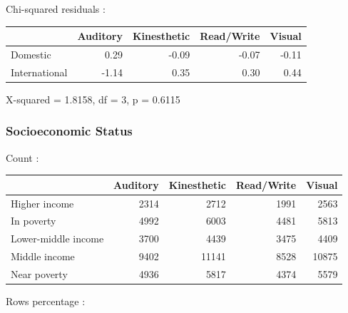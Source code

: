 \documentclass[
  twocolumn]{article}
\newenvironment{Shaded}{\begin{snugshade}}{\end{snugshade}}
\newcommand{\FunctionTok}[1]{\textcolor[rgb]{0.13,0.29,0.53}{\textbf{#1}}}
\newcommand{\NormalTok}[1]{#1}
\newcommand{\SpecialCharTok}[1]{\textcolor[rgb]{0.81,0.36,0.00}{\textbf{#1}}}
\begin{document}
Chi-squared residuals :

\begin{longtable}[]{@{}lrrrr@{}}
\toprule\noalign{}
& Auditory & Kinesthetic & Read/Write & Visual \\
\midrule\noalign{}
\endhead
\bottomrule\noalign{}
\endlastfoot
Domestic & 0.29 & -0.09 & -0.07 & -0.11 \\
International & -1.14 & 0.35 & 0.30 & 0.44 \\
\end{longtable}

X-squared = 1.8158, df = 3, p = 0.6115

\subsubsection{Socioeconomic Status}\label{socioeconomic-status-2}

\begin{Shaded}
\end{Shaded}

Count :

\begin{longtable}[]{@{}lrrrr@{}}
\toprule\noalign{}
& Auditory & Kinesthetic & Read/Write & Visual \\
\midrule\noalign{}
\endhead
\bottomrule\noalign{}
\endlastfoot
Higher income & 2314 & 2712 & 1991 & 2563 \\
In poverty & 4992 & 6003 & 4481 & 5813 \\
Lower-middle income & 3700 & 4439 & 3475 & 4409 \\
Middle income & 9402 & 11141 & 8528 & 10875 \\
Near poverty & 4936 & 5817 & 4374 & 5579 \\
\end{longtable}

Rows percentage :
\end{document}
